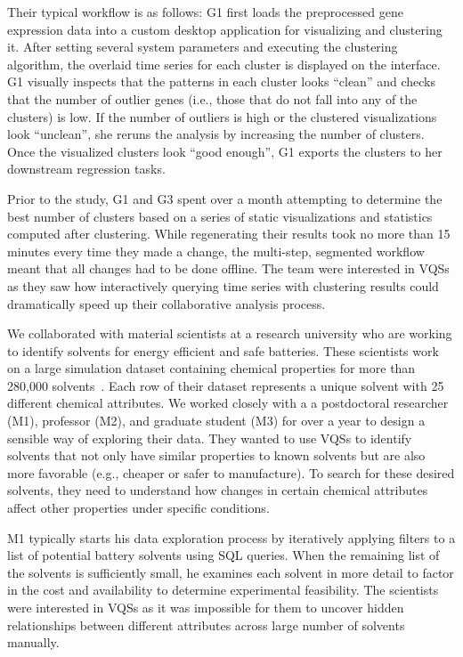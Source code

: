 \par Their typical workflow is as follows: G1 first loads the preprocessed gene expression data into a custom desktop application for visualizing and clustering it. After setting several system parameters and executing the clustering algorithm, the overlaid time series for each cluster is displayed on the interface. G1 visually inspects that the patterns in each cluster looks ``clean'' and checks that the number of outlier genes (i.e., those that do not fall into any of the clusters) is low.  If the number of outliers is high or the clustered visualizations look ``unclean'', she reruns the analysis by increasing the number of clusters. Once the visualized clusters look ``good enough'', G1 exports the clusters to her downstream regression tasks.
\par Prior to the study, G1 and G3 spent over a month attempting to determine the best number of clusters based on a series of static visualizations and statistics computed after clustering. While regenerating their results took no more than 15 minutes every time they made a change, the multi-step, segmented workflow meant that all changes had to be done offline. The team were interested in VQSs as they saw how interactively querying time series with clustering results could dramatically speed up their collaborative analysis process.
\par\noindent{} We collaborated with material scientists at a research university who are working to identify solvents for energy efficient and safe batteries. These scientists work on a large simulation dataset containing chemical properties for more than 280,000 solvents~\cite{Khetan2018}. Each row of their dataset represents a unique solvent with 25 different chemical attributes. We worked closely with a a postdoctoral researcher (M1), professor (M2), and graduate student (M3) for over a year to design a sensible way of exploring their data. They wanted to use VQSs to identify solvents that not only have similar properties to known solvents but are also more favorable (e.g., cheaper or safer to manufacture). To search for these desired solvents, they need to understand how changes in certain chemical attributes affect other properties under specific conditions.
\par M1 typically starts his data exploration process by iteratively applying filters to a list of potential battery solvents using SQL queries. When the remaining list of the solvents is sufficiently small, he examines each solvent in more detail to factor in the cost and availability to determine experimental feasibility. The scientists were interested in VQSs as it was impossible for them to uncover hidden relationships between different attributes across large number of solvents manually.%
